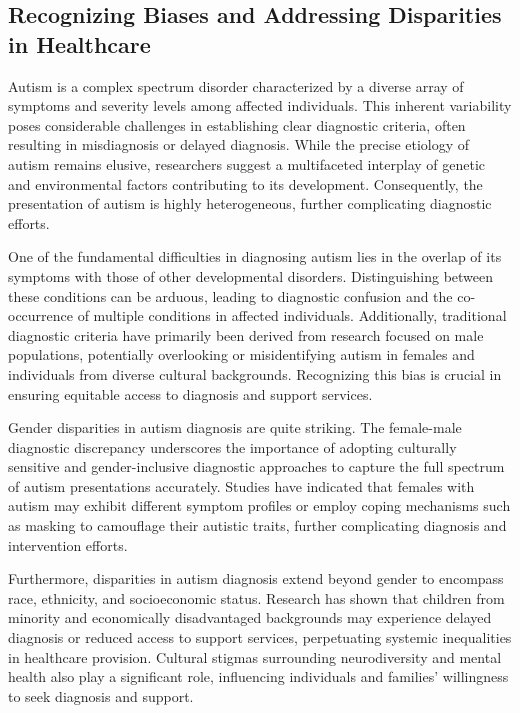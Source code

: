 \subsection{Recognizing Biases and Addressing Disparities in Healthcare}

Autism is a complex spectrum disorder characterized by a diverse array of symptoms and severity levels among affected individuals. This inherent variability poses considerable challenges in establishing clear diagnostic criteria, often resulting in misdiagnosis or delayed diagnosis. While the precise etiology of autism remains elusive, researchers suggest a multifaceted interplay of genetic and environmental factors contributing to its development. Consequently, the presentation of autism is highly heterogeneous, further complicating diagnostic efforts.

One of the fundamental difficulties in diagnosing autism lies in the overlap of its symptoms with those of other developmental disorders. Distinguishing between these conditions can be arduous, leading to diagnostic confusion and the co-occurrence of multiple conditions in affected individuals. Additionally, traditional diagnostic criteria have primarily been derived from research focused on male populations, potentially overlooking or misidentifying autism in females and individuals from diverse cultural backgrounds. Recognizing this bias is crucial in ensuring equitable access to diagnosis and support services.

Gender disparities in autism diagnosis are quite striking. The female-male diagnostic discrepancy underscores the importance of adopting culturally sensitive and gender-inclusive diagnostic approaches to capture the full spectrum of autism presentations accurately. Studies have indicated that females with autism may exhibit different symptom profiles or employ coping mechanisms such as masking to camouflage their autistic traits, further complicating diagnosis and intervention efforts.

Furthermore, disparities in autism diagnosis extend beyond gender to encompass race, ethnicity, and socioeconomic status. Research has shown that children from minority and economically disadvantaged backgrounds may experience delayed diagnosis or reduced access to support services, perpetuating systemic inequalities in healthcare provision. Cultural stigmas surrounding neurodiversity and mental health also play a significant role, influencing individuals and families' willingness to seek diagnosis and support.

